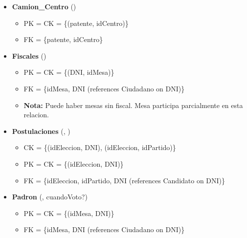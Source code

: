 \begin{itemize}
	
	\item \textbf{Camion\_Centro} () 
	\begin{itemize}
		\item PK = CK = \{(patente, idCentro)\}
		\item FK = \{patente, idCentro\}
	\end{itemize}
	\vspace{1mm}

	\item \textbf{Fiscales} () 
	\begin{itemize}
		\item PK = CK = \{(DNI, idMesa)\}
		\item FK = \{idMesa, DNI  (references Ciudadano on DNI)\}
		\item \textbf{Nota:} Puede haber mesas sin fiscal. Mesa participa parcialmente en esta relacion.
	\end{itemize}
	\vspace{1mm}

	\item \textbf{Postulaciones} (, ) 
	\begin{itemize}
		\item CK = \{(idEleccion, DNI), (idEleccion, idPartido)\}
		\item PK = CK = \{(idEleccion, DNI)\}
		\item FK = \{idEleccion, idPartido, DNI (references Candidato on DNI)\}
	\end{itemize}
	\vspace{1mm}
	
	\item \textbf{Padron} (, cuandoVoto?) 
	\begin{itemize}
		\item PK = CK = \{(idMesa, DNI)\}
		\item FK = \{idMesa, DNI (references Ciudadano on DNI)\}
	\end{itemize}
	\vspace{1mm}

\end{itemize}

